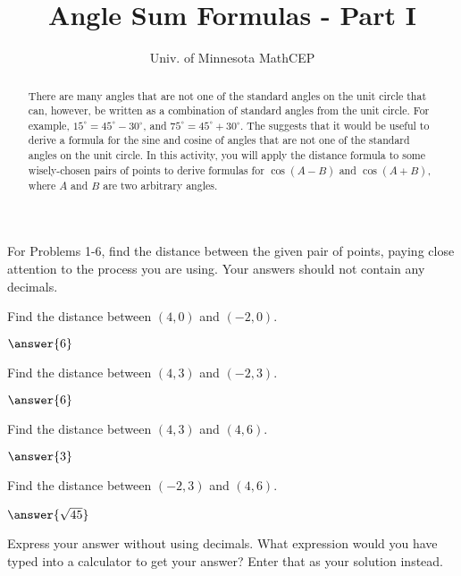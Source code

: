 \documentclass[number]{ximera}
\title{Angle Sum Formulas - Part I}
\author{Univ. of Minnesota MathCEP}
\begin{document}
\begin{abstract}
There are many angles that are not one of the standard angles on the unit circle that can, however, be written as a combination of standard angles from the unit circle. For example, $15^\circ = 45^\circ - 30^\circ$, and $75^\circ = 45^\circ + 30^\circ$. The suggests that it would be useful to derive a formula for the sine and cosine of angles that are not one of the standard angles on the unit circle. In this activity, you will apply the distance formula to some wisely-chosen pairs of points to derive formulas for $\cos(A-B)$ and $\cos(A+B)$, where $A$ and $B$ are two arbitrary angles.
\end{abstract}

\maketitle


For Problems 1-6, find the distance between the given pair of points, paying close attention to the process you are using. Your answers should not contain any decimals.

\begin{problem}
Find the distance between $(4,0)$ and $(-2,0)$.

$\answer{6}$
\end{problem}

\begin{problem}
Find the distance between $(4,3)$ and $(-2,3)$.

$\answer{6}$
\end{problem}

\begin{problem}
Find the distance between $(4,3)$ and $(4,6)$.

$\answer{3}$
\end{problem}

\begin{problem}
Find the distance between $(-2,3)$ and $(4,6)$.

$\answer{\sqrt{45}}$

\begin{hint}
Express your answer without using decimals. What expression would you have typed into a calculator to get your answer? Enter that as your solution instead.
\end{hint}

\end{problem}
\end{document}
